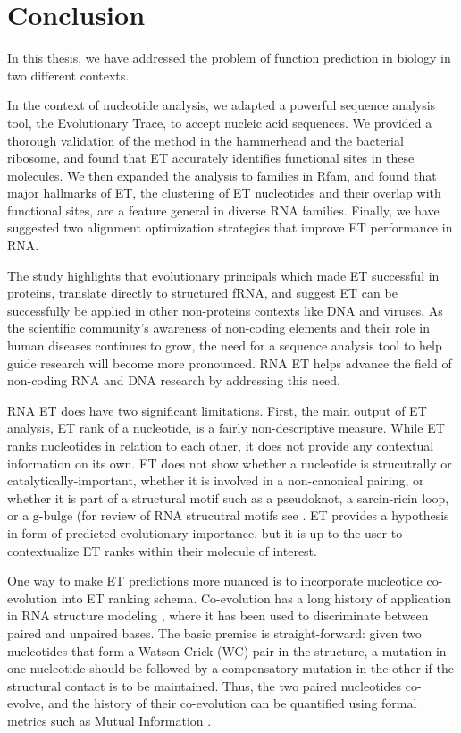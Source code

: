 \documentclass[12pt,a4paper]{report}
\begin{document}
{{\chapter[Conclusion]{\LARGE Conclusion}
\clearpage

In this thesis, we have addressed the problem of function prediction in biology in two different contexts.

In the context of nucleotide analysis, we adapted a powerful sequence analysis tool, the Evolutionary Trace, to accept nucleic acid sequences. We provided a thorough validation of the method in the hammerhead and the bacterial ribosome, and found that ET accurately identifies functional sites in these molecules. We then expanded the analysis to families in Rfam, and found that major hallmarks of ET, the clustering of ET nucleotides and their overlap with functional sites, are a feature general in diverse RNA families. Finally, we have suggested two alignment optimization strategies that improve ET performance in RNA.

The study highlights that evolutionary principals which made ET successful in proteins, translate directly to structured fRNA, and suggest ET can be successfully be applied in other non-proteins contexts like DNA and viruses. As the scientific community's awareness of non-coding elements and their role in human diseases continues to grow, the need for a sequence analysis tool to help guide research will become more pronounced. RNA ET helps advance the field of non-coding RNA and DNA research by addressing this need.

RNA ET does have two significant limitations. First, the main output of ET analysis, ET rank of a nucleotide, is a fairly non-descriptive measure. While ET ranks nucleotides in relation to each other, it does not provide any contextual information on its own. ET does not show whether a nucleotide is strucutrally or catalytically-important, whether it is involved in a non-canonical pairing, or whether it is part of a structural motif such as a pseudoknot, a sarcin-ricin loop, or a g-bulge (for review of RNA strucutral motifs see \cite{Miao2017}. ET provides a hypothesis in form of predicted evolutionary importance, but it is up to the user to contextualize ET ranks within their molecule of interest.

One way to make ET predictions more nuanced is to incorporate nucleotide co-evolution into ET ranking schema. Co-evolution has a long history of application in RNA structure modeling \cite{Levitt1969, fox_woese_5s_nature1975, Westhof1990}, where it has been used to discriminate between paired and unpaired bases. The basic premise is straight-forward: given two nucleotides that form a Watson-Crick (WC) pair in the structure, a mutation in one nucleotide should be followed by a compensatory mutation in the other if the structural contact is to be maintained. Thus, the two paired nucleotides co-evolve, and the history of their co-evolution can be quantified using formal metrics such as Mutual Information \cite{Freyhult2005}.

}}
\end{document}

